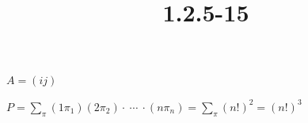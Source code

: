 \documentclass{article}
\title{1.2.5-15}
\begin{document}
\maketitle

$A = (ij)$

$P = \sum_{\pi} (1\pi_1)(2\pi_2) \cdot\ \cdots\ \cdot (n\pi_n) = \sum_{\pi} (n!)^2 = (n!)^3$
\end{document}
